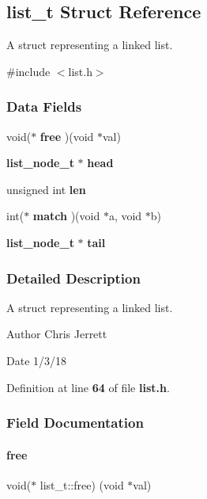 \subsection{list\+\_\+t Struct Reference}
\label{structlist__t}


A struct representing a linked list.  




{\ttfamily \#include $<$list.\+h$>$}

\subsubsection*{Data Fields}
\begin{DoxyCompactItemize}
\item 
void($\ast$ \textbf{ free} )(void $\ast$val)
\item 
\textbf{ list\+\_\+node\+\_\+t} $\ast$ \textbf{ head}
\item 
unsigned int \textbf{ len}
\item 
int($\ast$ \textbf{ match} )(void $\ast$a, void $\ast$b)
\item 
\textbf{ list\+\_\+node\+\_\+t} $\ast$ \textbf{ tail}
\end{DoxyCompactItemize}


\subsubsection{Detailed Description}
A struct representing a linked list. 

\begin{DoxyAuthor}{Author}
Chris Jerrett 
\end{DoxyAuthor}
\begin{DoxyDate}{Date}
1/3/18 
\end{DoxyDate}


Definition at line \textbf{ 64} of file \textbf{ list.\+h}.



\subsubsection{Field Documentation}
\mbox{\label{structlist__t_adbc5f9e0707a09a027c89218ff0a8f69}} 
\paragraph{free}
{\footnotesize\ttfamily void($\ast$ list\+\_\+t\+::free) (void $\ast$val)}



